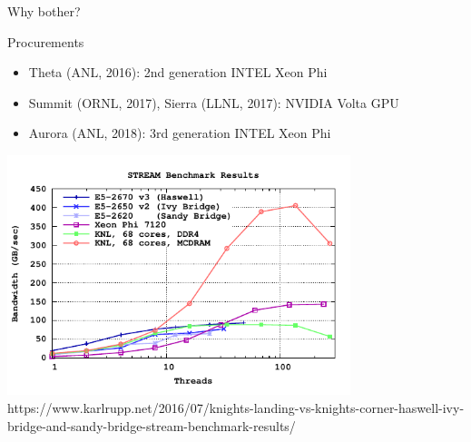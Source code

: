 \begin{frame}{Why bother?}
  \begin{block}{Procurements}
  \begin{itemize}
   \item Theta (ANL, 2016): 2nd generation INTEL Xeon Phi
   \item Summit (ORNL, 2017), Sierra (LLNL, 2017): NVIDIA Volta GPU
   \item Aurora (ANL, 2018): 3rd generation INTEL Xeon Phi
  \end{itemize}
  \end{block}
  
  \begin{center} \vspace*{-0.5cm}
   \includegraphics[width=0.75\textwidth]{figures/stream-knl.pdf} \\
   {\tiny https://www.karlrupp.net/2016/07/knights-landing-vs-knights-corner-haswell-ivy-bridge-and-sandy-bridge-stream-benchmark-results/}
  \end{center}

\end{frame}


